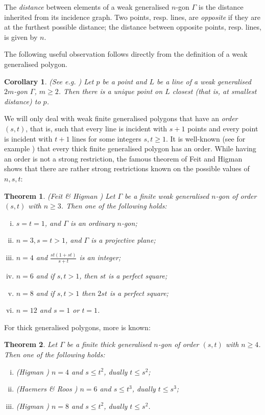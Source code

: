 \documentclass[12pt]{article}
\newtheorem{theorem}{Theorem}
\newtheorem{corollary}{Corollary}
\theoremstyle{remark}
\begin{document}
The {\em distance} between elements of a weak generalised $n$-gon $\Gamma$ is the distance inherited from its incidence graph. Two points, resp. lines, are {\em opposite} if they are at the furthest possible distance; the distance between opposite points, resp. lines, is given by $n$.

The following useful observation follows directly from the definition of a weak generalised polygon. 
\begin{corollary}(See e.g. \cite[Theorem 1.3.5]{Hendrik})
\label{uniqueClosest}
	Let \(p\) be a point and \(L\) be a line of a weak generalised \(2m\)-gon \(\Gamma\), $m\geq 2$. Then there is a unique point on \(L\) closest (that is, at smallest distance) to \(p\). 
\end{corollary}


We will only deal with weak finite generalised polygons that have an {\em order} $(s,t)$, that is, such that every line is incident with \(s+1\) points and every point is incident with \(t+1\) lines for some integers $s,t\geq 1$. It is well-known (see for example \cite[Corollary 1.5.3]{Hendrik}) that every thick finite generalised polygon has an order. While having an order is not a strong restriction, the famous theorem of Feit and Higman shows that there are rather strong restrictions known on the possible values of $n,s,t$:

\begin{theorem}(Feit \& Higman \cite{FEITHIGMAN})
	Let \(\Gamma\) be a finite weak generalised \(n\)-gon of order \((s,t)\) with \(n\ge 3\). Then one of the following holds:
	\begin{enumerate}[(i)]
		\item \(s=t=1\), and \(\Gamma\) is an ordinary \(n\)-gon;
		\item \(n=3,s=t>1\), and \(\Gamma\) is a projective plane;
		\item \(n = 4\) and \(\frac{st(1+st)}{s+t}\) is an integer;
		\item \(n=6\) and if \(s,t>1\), then \(st\) is a perfect square;
		\item \(n=8\) and if \(s,t>1\) then \(2st\) is a perfect square;
		\item \(n=12\) and \(s=1\) or \(t=1\). 
	\end{enumerate}
\end{theorem}
For thick generalised polygons, more is known:
\begin{theorem}
	Let \(\Gamma\) be a finite thick generalised \(n\)-gon of order \((s,t)\) with \(n\ge 4\). Then one of the following holds:
	\begin{enumerate}[(i)]
		\item (Higman \cite{Higman}) \(n = 4 \) and \(s\le t^2\), dually \(t\le s^2\);
		\item (Haemers \& Roos \cite{HaemersAndRoos}) \(n = 6\) and \(s\le t^3\), dually \(t\le s^3\);
		\item (Higman \cite{Higman}) \(n = 8\) and \(s\le t^2\), dually \(t\le s^2\).
		
	\end{enumerate}
\end{theorem}
\end{document}
